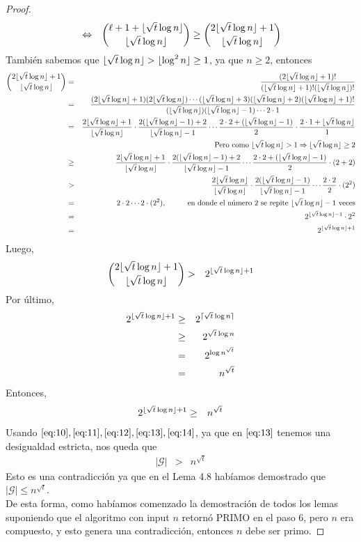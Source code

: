 \begin{proof}
\begin{eqnarray}
	&\Leftrightarrow &{{\ell +1+\lfloor\sqrt{t}\log n\rfloor}\choose{\lfloor\sqrt{t}\log n\rfloor}}\geq {{2\lfloor\sqrt{t}\log n\rfloor+1}\choose{\lfloor\sqrt{t}\log n\rfloor}}\label{eq:12}
\end{eqnarray}
	También sabemos que $\lfloor\sqrt{t}\log n\rfloor > \lfloor \log ^2n\rfloor\geq 1$, ya que $n\geq 2$, entonces
	\begin{eqnarray}
		{{2\lfloor\sqrt{t}\log n\rfloor+1}\choose{\lfloor\sqrt{t}\log n\rfloor}} &=& \frac{(2\lfloor\sqrt{t}\log n\rfloor +1)!}{(\lfloor\sqrt{t}\log n\rfloor +1)!(\lfloor\sqrt{t}\log n\rfloor)!} \nonumber\\
		&=&\frac{(2\lfloor\sqrt{t}\log n\rfloor+1)(2\lfloor\sqrt{t}\log n\rfloor)\cdots(\lfloor\sqrt{t}\log n\rfloor+3)(\lfloor\sqrt{t}\log n\rfloor +2)(\lfloor\sqrt{t}\log n\rfloor +1)!}{(\lfloor\sqrt{t}\log n\rfloor)(\lfloor\sqrt{t}\log n\rfloor -1)\cdots2\cdot 1}\nonumber\\
		&=&\frac{2\lfloor\sqrt{t}\log n\rfloor+1}{\lfloor\sqrt{t}\log n\rfloor}\cdot\frac{2(\lfloor\sqrt{t}\log n\rfloor -1)+2}{\lfloor\sqrt{t}\log n\rfloor-1}\cdots\frac{2\cdot 2 + (\lfloor\sqrt{t}\log n\rfloor-1)}{2}\cdot\frac{2\cdot 1 +\lfloor\sqrt{t}\log n\rfloor}{1}\nonumber\\
		& &\text{Pero como }\lfloor\sqrt{t}\log n\rfloor >1 \Rightarrow \lfloor\sqrt{t}\log n\rfloor \geq 2\nonumber\\
		&\geq& \frac{2\lfloor\sqrt{t}\log n\rfloor+1}{\lfloor\sqrt{t}\log n\rfloor}\cdot\frac{2(\lfloor\sqrt{t}\log n\rfloor -1)+2}{\lfloor\sqrt{t}\log n\rfloor-1}\cdots\frac{2\cdot 2 + (\lfloor\sqrt{t}\log n\rfloor-1)}{2}\cdot (2+2)\nonumber\\
		&>&	\frac{2\lfloor\sqrt{t}\log n\rfloor}{\lfloor\sqrt{t}\log n\rfloor}\cdot\frac{2(\lfloor\sqrt{t}\log n\rfloor -1)}{\lfloor\sqrt{t}\log n\rfloor-1}\cdots\frac{2\cdot 2 }{2}\cdot (2^2)\nonumber\\
		&=& 2\cdot 2\cdots 2\cdot (2^2),\hspace{1cm}\text{en donde el número } 2 \text{ se repite }\lfloor\sqrt{t}\log n\rfloor-1 \text{ veces}\nonumber\\
		&=& 2^{\lfloor\sqrt{t}\log n\rfloor -1}\cdot 2^2\nonumber\\ 
		&=& 2^{\lfloor\sqrt{t}\log n\rfloor +1}\nonumber
	\end{eqnarray}
	Luego, 
	\begin{eqnarray}
		{{2\lfloor\sqrt{t}\log n\rfloor+1}\choose{\lfloor\sqrt{t}\log n\rfloor}}&>& 2^{\lfloor\sqrt{t}\log n\rfloor +1}\label{eq:13} 
	\end{eqnarray}
	Por último,
	\begin{eqnarray}
		 2^{\lfloor\sqrt{t}\log n\rfloor +1} &\geq &  2^{\lceil \sqrt{t} \log n \rceil}\nonumber\\
		 &\geq &2^{\sqrt{t}\log n}\nonumber\\
		 &=& 2^{\log {n^{\sqrt{t}}}}\nonumber\\
		 &=& n^{\sqrt{t}}\nonumber
	\end{eqnarray}
	Entonces,
	\begin{eqnarray}
		2^{\lfloor\sqrt{t}\log n\rfloor +1} &\geq & n^{\sqrt{t}}\label{eq:14}
	\end{eqnarray}
	Usando $\eqref{eq:10},\eqref{eq:11},\eqref{eq:12},\eqref{eq:13},\eqref{eq:14}$, ya que en $\eqref{eq:13}$ tenemos una desigualdad estricta, nos queda que 
	\begin{eqnarray}
		|\mathcal{G}|&>& n^{\sqrt{t}}\nonumber
	\end{eqnarray}
	Esto es una contradicción ya que en el Lema 4.8 habí­amos demostrado que $|\mathcal{G}|\leq n^{\sqrt{t}}$. \\
	De esta forma, como habí­amos comenzado la demostración de todos los lemas suponiendo que el algoritmo con input $n$ retornó PRIMO en el paso 6, pero $n$ era compuesto, y esto genera una contradicción, entonces $n$ debe ser primo. 
	
	\end{proof}
